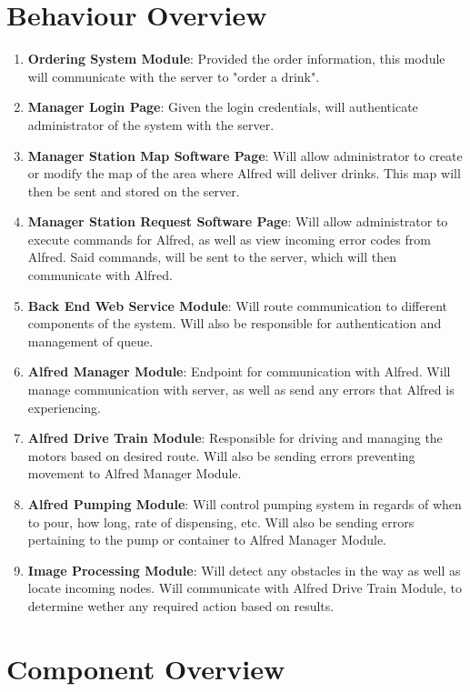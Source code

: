 \documentclass [10pt]{article}
\begin{document}
\section{Behaviour Overview}
\begin{enumerate}
	\item \textbf{Ordering System Module}: Provided the order information, this module will communicate with the server to "order a drink".
	\item \textbf{Manager Login Page}: Given the login credentials, will authenticate administrator of the system with the server.
	\item \textbf{Manager Station Map Software Page}: Will allow administrator to create or modify the map of the area where Alfred will deliver drinks. This map will then be sent and stored on the server.
	\item \textbf{Manager Station Request Software Page}: Will allow administrator to execute commands for Alfred, as well as view incoming error codes from Alfred. Said commands, will be sent to the server, which will then communicate with Alfred.
	\item \textbf{Back End Web Service Module}: Will route communication to different components of the system. Will also be responsible for authentication and management of queue. 
	\item \textbf{Alfred Manager Module}: Endpoint for communication with Alfred. Will manage communication with server, as well as send any errors that Alfred is experiencing.
	\item \textbf{Alfred Drive Train Module}: Responsible for driving and managing the motors based on desired route. Will also be sending errors preventing movement to Alfred Manager Module.
	\item \textbf{Alfred Pumping Module}: Will control pumping system in regards of when to pour, how long, rate of dispensing, etc. Will also be sending errors pertaining to the pump or container to Alfred Manager Module.
	\item \textbf{Image Processing Module}: Will detect any obstacles in the way as well as locate incoming nodes. Will communicate with Alfred Drive Train Module, to determine wether any required action based on results.
\end{enumerate}


\section{Component Overview}
\end{document}
